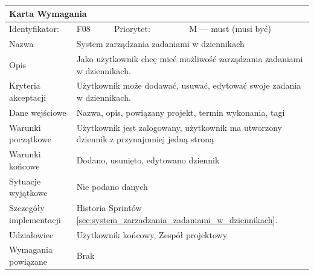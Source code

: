 \documentclass[a4paper,11pt]{report}
\begin{document}
		\begin{tabular}{|p{3cm}|p{2cm}|p{2cm}|p{6cm}|}
		\hline
		\multicolumn{4}{|p{12 cm}|}{Karta Wymagania}\\
		\hline
		Identyfikator: & F08 & Priorytet: & M — must (musi być)\\
		\hline
		Nazwa & \multicolumn{3}{|p{10 cm}|}{System zarządzania zadaniami w dziennikach}\\
		\hline
		Opis & \multicolumn{3}{|p{10 cm}|}{Jako użytkownik chcę mieć możliwość zarządzania zadaniami w dziennikach.}\\
		\hline
		Kryteria akceptacji & \multicolumn{3}{|p{10 cm}|}{Użytkownik może dodawać, usuwać, edytować swoje zadania w dziennikach.}\\
		\hline
		Dane wejściowe & \multicolumn{3}{|p{10 cm}|}{Nazwa, opis, powiązany projekt, termin wykonania, tagi}\\
		\hline
		Warunki początkowe & \multicolumn{3}{|p{10 cm}|}{Użytkownik jest zalogowany, użytkownik ma utworzony dziennik z przynajmniej jedną stroną}\\
		\hline
		Warunki końcowe & \multicolumn{3}{|p{10 cm}|}{Dodano, usunięto, edytowano dziennik}\\
		\hline
		Sytuacje wyjątkowe & \multicolumn{3}{|p{10 cm}|}{Nie podano danych}\\
		\hline
		Szczegóły implementacji & \multicolumn{3}{|p{10 cm}|}{Historia Sprintów \ref{sec:system_zarzadzania_zadaniami_w_dziennikach}.}\\
		\hline
		Udziałowiec & \multicolumn{3}{|p{10 cm}|}{Użytkownik końcowy, Zespół projektowy}\\
		\hline
		Wymagania powiązane & \multicolumn{3}{|p{10 cm}|}{Brak}\\
		\hline
		\end{tabular}
		\newline
		\vspace*{0,2 cm}
		\newline
\end{document}

